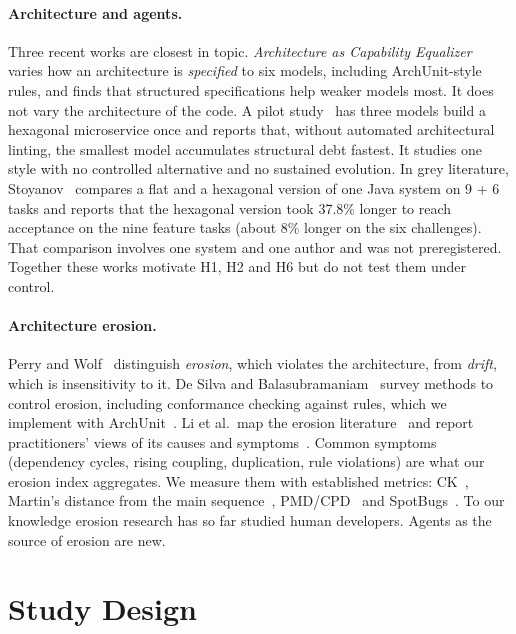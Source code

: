 \documentclass[10pt]{article}
\begin{document}
\paragraph{Architecture and agents.} Three recent works are closest in topic. \emph{Architecture as
Capability Equalizer}~\citep{archequalizer2026} varies how an architecture is \emph{specified} to
six models, including ArchUnit-style rules, and finds that structured specifications help weaker
models most. It does not vary the architecture of the code. A pilot study~\citep{hexdebt2025} has
three models build a hexagonal microservice once and reports that, without automated
architectural linting, the smallest model accumulates structural debt fastest. It studies one
style with no controlled alternative and no sustained evolution. In grey literature, Stoyanov~\citep{stoyanov2026hexagonal} compares a flat
and a hexagonal version of one Java system on 9 + 6 tasks and reports that the hexagonal version
took 37.8\% longer to reach acceptance on the nine feature tasks (about 8\% longer on the six
challenges). That comparison involves one system and one author and was
not preregistered. Together these works motivate H1, H2 and H6 but do not test them under control.

\paragraph{Architecture erosion.} Perry and Wolf~\citep{perry1992foundations} distinguish
\emph{erosion}, which violates the architecture, from \emph{drift}, which is insensitivity to it.
De Silva and Balasubramaniam~\citep{desilva2012erosion} survey methods to control erosion,
including conformance checking against rules, which we implement with
ArchUnit~\citep{archunit}. Li et al.\ map the erosion literature~\citep{li2022erosionmapping} and
report practitioners' views of its causes and symptoms~\citep{li2021erosionpractitioners}. Common
symptoms (dependency cycles, rising coupling, duplication, rule violations) are what our erosion
index aggregates. We measure them with established metrics: CK~\citep{chidamber1994metrics,aniche2015ck},
Martin's distance from the main sequence~\citep{martin2002agile}, PMD/CPD~\citep{pmd} and
SpotBugs~\citep{spotbugs}. To our knowledge erosion research has so far studied human developers.
Agents as the source of erosion are new.

\section{Study Design}\label{sec:design}
\end{document}
